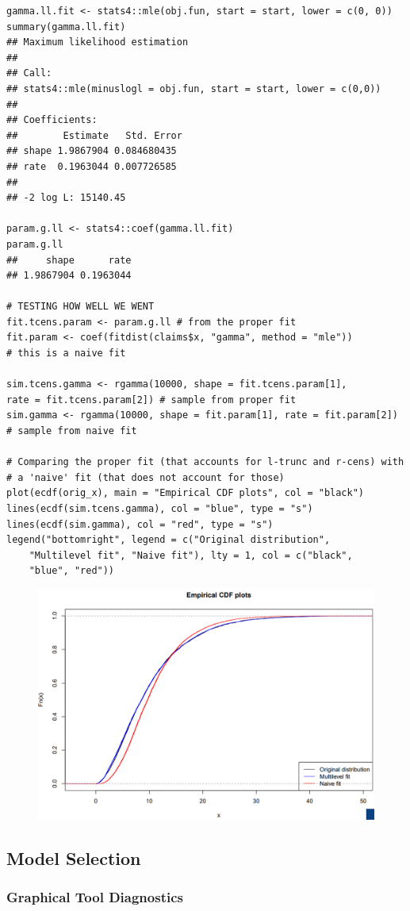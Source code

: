\documentclass[11pt]{article}
\begin{document}
\begin{lstlisting}
gamma.ll.fit <- stats4::mle(obj.fun, start = start, lower = c(0, 0))
summary(gamma.ll.fit)
## Maximum likelihood estimation
##
## Call:
## stats4::mle(minuslogl = obj.fun, start = start, lower = c(0,0))
##
## Coefficients:
##        Estimate   Std. Error
## shape 1.9867904 0.084680435
## rate  0.1963044 0.007726585
##
## -2 log L: 15140.45

param.g.ll <- stats4::coef(gamma.ll.fit)
param.g.ll
##     shape      rate
## 1.9867904 0.1963044

# TESTING HOW WELL WE WENT
fit.tcens.param <- param.g.ll # from the proper fit
fit.param <- coef(fitdist(claims$x, "gamma", method = "mle"))
# this is a naive fit

sim.tcens.gamma <- rgamma(10000, shape = fit.tcens.param[1],
rate = fit.tcens.param[2]) # sample from proper fit
sim.gamma <- rgamma(10000, shape = fit.param[1], rate = fit.param[2])
# sample from naive fit

# Comparing the proper fit (that accounts for l-trunc and r-cens) with
# a 'naive' fit (that does not account for those)
plot(ecdf(orig_x), main = "Empirical CDF plots", col = "black")
lines(ecdf(sim.tcens.gamma), col = "blue", type = "s")
lines(ecdf(sim.gamma), col = "red", type = "s")
legend("bottomright", legend = c("Original distribution",
    "Multilevel fit", "Naive fit"), lty = 1, col = c("black",
    "blue", "red"))
\end{lstlisting}
\begin{figure}[H]
    \centering
    \includegraphics[width=0.7\linewidth]{l-trunc and r-cens final results plot.png}
\end{figure}

\subsection{Model Selection}
\subsubsection{Graphical Tool Diagnostics}
\end{document}
